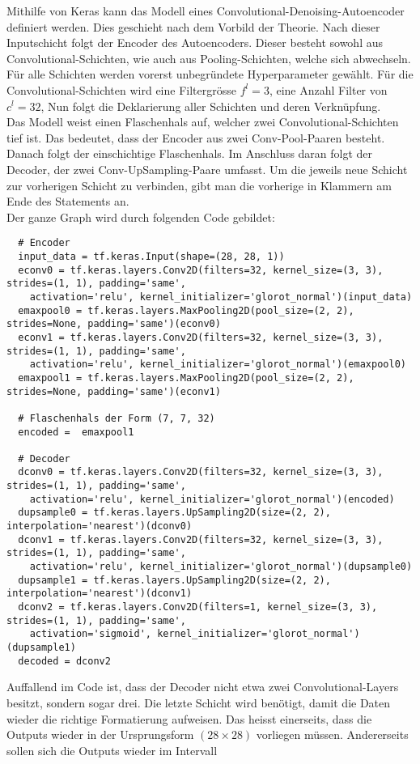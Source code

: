 Mithilfe von Keras kann das Modell eines Convolutional-Denoising-Autoencoder
definiert werden. Dies geschieht nach dem Vorbild der Theorie.
Nach dieser Inputschicht folgt der Encoder des Autoencoders. Dieser besteht
sowohl aus Convolutional-Schichten, wie auch aus Pooling-Schichten, welche sich abwechseln.
Für alle Schichten werden vorerst unbegründete Hyperparameter gewählt.
Für die Convolutional-Schichten wird
eine Filtergrösse $f^l = 3$, eine Anzahl Filter von $c^l = 32$,
Nun folgt die Deklarierung aller Schichten und deren Verknüpfung. \\
Das Modell weist einen Flaschenhals auf, welcher zwei Convolutional-Schichten
tief ist. Das bedeutet, dass der Encoder aus zwei
Conv-Pool-Paaren besteht. Danach folgt der einschichtige
Flaschenhals. Im Anschluss daran folgt der Decoder, der zwei
Conv-UpSampling-Paare umfasst.
Um die jeweils neue Schicht zur vorherigen Schicht zu verbinden, gibt man die
vorherige in Klammern am Ende des Statements an. \\
Der ganze Graph wird durch folgenden Code gebildet:
\begin{verbatim}
  # Encoder
  input_data = tf.keras.Input(shape=(28, 28, 1))
  econv0 = tf.keras.layers.Conv2D(filters=32, kernel_size=(3, 3), strides=(1, 1), padding='same',
    activation='relu', kernel_initializer='glorot_normal')(input_data)
  emaxpool0 = tf.keras.layers.MaxPooling2D(pool_size=(2, 2), strides=None, padding='same')(econv0)
  econv1 = tf.keras.layers.Conv2D(filters=32, kernel_size=(3, 3), strides=(1, 1), padding='same',
    activation='relu', kernel_initializer='glorot_normal')(emaxpool0)
  emaxpool1 = tf.keras.layers.MaxPooling2D(pool_size=(2, 2), strides=None, padding='same')(econv1)

  # Flaschenhals der Form (7, 7, 32)
  encoded =  emaxpool1

  # Decoder
  dconv0 = tf.keras.layers.Conv2D(filters=32, kernel_size=(3, 3), strides=(1, 1), padding='same',
    activation='relu', kernel_initializer='glorot_normal')(encoded)
  dupsample0 = tf.keras.layers.UpSampling2D(size=(2, 2), interpolation='nearest')(dconv0)
  dconv1 = tf.keras.layers.Conv2D(filters=32, kernel_size=(3, 3), strides=(1, 1), padding='same',
    activation='relu', kernel_initializer='glorot_normal')(dupsample0)
  dupsample1 = tf.keras.layers.UpSampling2D(size=(2, 2), interpolation='nearest')(dconv1)
  dconv2 = tf.keras.layers.Conv2D(filters=1, kernel_size=(3, 3), strides=(1, 1), padding='same',
    activation='sigmoid', kernel_initializer='glorot_normal')(dupsample1)
  decoded = dconv2
\end{verbatim}
Auffallend im Code ist, dass der Decoder nicht etwa zwei Convolutional-Layers
besitzt, sondern sogar drei. Die letzte Schicht wird benötigt, damit
die Daten wieder die richtige Formatierung aufweisen. Das heisst einerseits,
dass die Outputs wieder in der Ursprungsform $(28 \times 28)$ vorliegen müssen.
Andererseits sollen sich die Outputs wieder im Intervall

